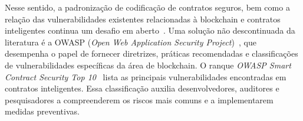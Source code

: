 \documentclass[12pt]{article}
\newcommand{\abv}[1]{\textcolor{red}{\bf \# #1 \#}}
\begin{document}
Nesse sentido, a padronização de codificação de contratos seguros, bem como a relação das vulnerabilidades existentes relacionadas à blockchain e contratos inteligentes continua um desafio em aberto~\cite{ressi2024vulnerability}. Uma solução não descontinuada da literatura é a OWASP (\textit{Open Web Application Security Project})~\cite{owasporg}, que desempenha o papel de fornecer diretrizes, práticas recomendadas e classificações de vulnerabilidades específicas da área de blockchain. O ranque \textit{OWASP Smart Contract Security Top 10}~\cite{owasptop10} lista as principais vulnerabilidades encontradas em contratos inteligentes. Essa classificação auxilia desenvolvedores, auditores e pesquisadores a compreenderem os riscos mais comuns e a implementarem medidas preventivas.
\end{document}
